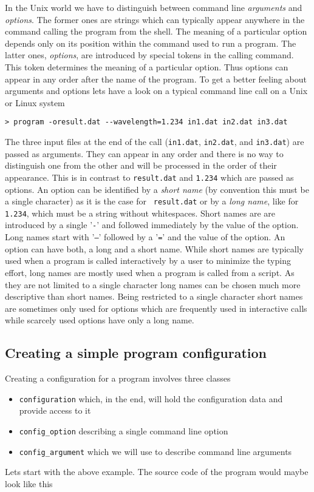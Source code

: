 In the Unix world we have to distinguish between command line {\em arguments}
and {\em options}. The former ones are strings which can typically appear
anywhere in the command calling the program from the shell. The meaning of a
particular option depends only on its position within the command used to run a
program. 
The latter ones, {\em options}, are introduced by special tokens in the calling
command. This token determines the meaning of a particular option. Thus options
can appear in any order after the name of the program. 
To get a better feeling about arguments and options lets have a look on a
typical command line call on a Unix or Linux system
\begin{verbatim}
> program -oresult.dat --wavelength=1.234 in1.dat in2.dat in3.dat
\end{verbatim}
The three input files at the end of the call (\texttt{in1.dat}, \texttt{in2.dat}, and
\texttt{in3.dat}) are passed as arguments. They can appear in any order and there
is no way to distinguish one from the other and will be processed in the order
of their appearance. This is in contrast to \texttt{result.dat} and \texttt{1.234}
which are passed as options. An option can be identified by a {\em short name} (by
convention this must be a single character) as it is the case for \texttt{
result.dat} or by a {\em long name}, like for \texttt{1.234}, which must be a
string without whitespaces. Short names are are introduced by a single '\texttt{-}'
and followed immediately by the value of the option. Long names start with
'\texttt{--}' followed by a '\texttt{=}' and the value of the option. An option can have both,
a long and a short name. While short names are typically used when a program is
called interactively by a user to minimize the typing effort, long names are
mostly used when a program is called from a script. As they are not limited to a
single character long names can be chosen much more descriptive than short
names. Being restricted to a single character short names are sometimes only
used for options which are frequently used in interactive calls while scarcely
used options have only a long name.

\subsection{Creating a simple program configuration}

Creating a configuration for a program involves three classes
\begin{itemize}
\item \texttt{configuration} which, in the end, will hold the configuration data
and provide access to it
\item \texttt{config\_option} describing a single command line option
\item \texttt{config\_argument} which we will use to describe command line arguments 
\end{itemize}
Lets start with the above example. The source code of the program would maybe
look like this

